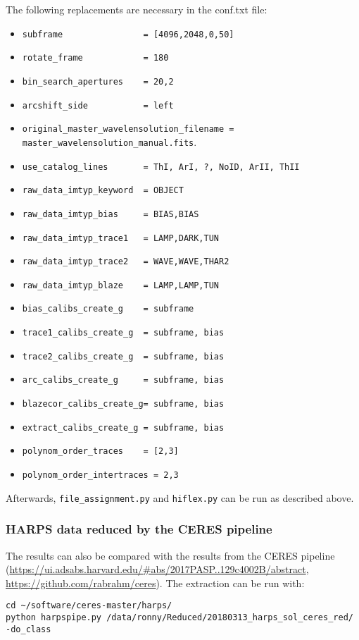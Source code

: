 \documentclass[10pt,a4paper]{article}
\begin{document}
\noindent The following replacements are necessary in the conf.txt file:
\begin{itemize}\small\setlength\itemsep{-0.1cm}
  \small
  \item \verb|subframe                = [4096,2048,0,50]|
  \item \verb|rotate_frame            = 180|
  \item \verb|bin_search_apertures    = 20,2|
  \item \verb|arcshift_side           = left|
  \item \verb|original_master_wavelensolution_filename = master_wavelensolution_manual.fits|.
  \item \verb|use_catalog_lines 	  = ThI, ArI, ?, NoID, ArII, ThII|
  \item \verb|raw_data_imtyp_keyword  = OBJECT|
  \item \verb|raw_data_imtyp_bias     = BIAS,BIAS|
  \item \verb|raw_data_imtyp_trace1   = LAMP,DARK,TUN|
  \item \verb|raw_data_imtyp_trace2   = WAVE,WAVE,THAR2|
  \item \verb|raw_data_imtyp_blaze    = LAMP,LAMP,TUN|
  \item \verb|bias_calibs_create_g    = subframe|
  \item \verb|trace1_calibs_create_g  = subframe, bias|
  \item \verb|trace2_calibs_create_g  = subframe, bias|
  \item \verb|arc_calibs_create_g     = subframe, bias|
  \item \verb|blazecor_calibs_create_g= subframe, bias|
  \item \verb|extract_calibs_create_g = subframe, bias|
  \item \verb|polynom_order_traces    = [2,3]|
  \item \verb|polynom_order_intertraces = 2,3|
\end{itemize}

\noindent Afterwards, \verb|file_assignment.py| and \verb|hiflex.py| can be run as described above.

\subsubsection{HARPS data reduced by the CERES pipeline}
The results can also be compared with the results from the CERES pipeline (\url{https://ui.adsabs.harvard.edu/#abs/2017PASP..129c4002B/abstract}, \url{https://github.com/rabrahm/ceres}). The extraction can be run with:
\begin{lstlisting}[style=base]
cd ~/software/ceres-master/harps/
python harpspipe.py /data/ronny/Reduced/20180313_harps_sol_ceres_red/ -do_class
\end{lstlisting}
\end{document}
